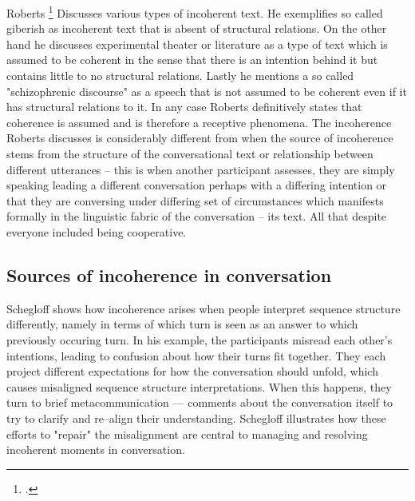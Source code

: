 \documentclass[12pt]{report}
\begin{document}
{Roberts \footcite{Roberts01101993} Discusses various types of incoherent text.
He exemplifies so called giberish as incoherent text that is absent of structural relations.
On the other hand he discusses experimental theater or literature as a type of text
which is assumed to be coherent in the sense that there is an intention behind it
but contains little to no structural relations.
Lastly he mentions a so called "schizophrenic discourse" as a speech that
is not assumed to be coherent even if it has structural relations to it.
In any case Roberts definitively states that coherence is assumed
and is therefore a receptive phenomena.
The incoherence Roberts discusses is considerably different from when
the source of incoherence stems from
    the structure of the conversational text or
    relationship between different utterances
    – this is when another participant assesses,
        they are simply speaking leading a different conversation
        perhaps with a differing intention
        or that they are conversing under differing set of circumstances
        which manifests formally in the linguistic fabric of the conversation – its text.
        All that despite everyone included being cooperative.

\subsection{Sources of incoherence in conversation}
\par
Schegloff shows how incoherence arises when
people interpret sequence structure differently,
namely in terms of which turn is seen as an answer to which previously occuring turn.
In his example, the participants misread each other’s intentions,
leading to confusion about how their turns fit together.
They each project different expectations for how the conversation should unfold,
which causes misaligned sequence structure interpretations.
When this happens,
they turn to brief metacommunication — comments about the conversation itself
to try to clarify and re–align their understanding.
Schegloff illustrates how these
efforts to "repair" the misalignment are central to
managing and resolving incoherent moments in conversation.

}
\end{document}
